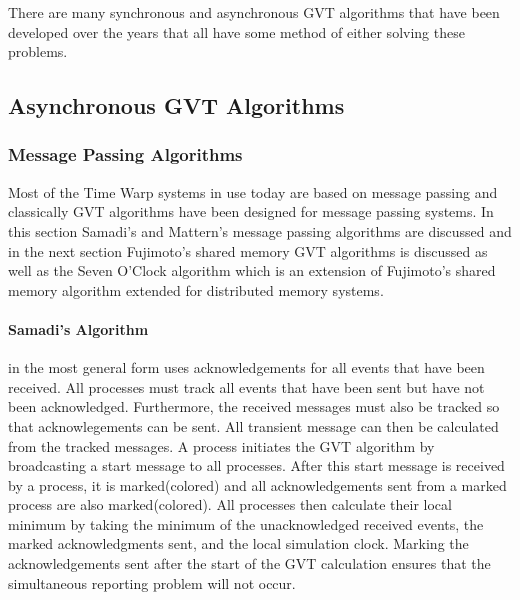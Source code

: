 \documentclass[11pt]{book}
\begin{document}
\noindent
There are many synchronous and asynchronous GVT algorithms that have been developed over the
years that all have some method of either solving these problems.

\subsection{Asynchronous GVT Algorithms}

\subsubsection{Message Passing Algorithms}

Most of the Time Warp systems in use today are based on message passing and classically
GVT algorithms have been designed for message passing systems.  In this section Samadi's and
Mattern's message passing algorithms are discussed and in the next section Fujimoto's shared
memory GVT algorithms is discussed as well as the Seven O'Clock algorithm which is an
extension of Fujimoto's shared memory algorithm extended for distributed memory systems.

\paragraph{Samadi's Algorithm}\cite{samadi-85} in the most general form uses acknowledgements
for all events that have been received.  All processes must track all events that have been
sent but have not been acknowledged.  Furthermore, the received messages must also be tracked
so that acknowlegements can be sent.  All transient message can then be calculated from the
tracked messages.  A process initiates the GVT algorithm by broadcasting a start message to
all processes.  After this start message is received by a process, it is marked(colored) and
all acknowledgements sent from a marked process are also marked(colored).  All processes then
calculate their local minimum by taking the minimum of the unacknowledged received events,
the marked acknowledgments sent, and the local simulation clock.  Marking the acknowledgements
sent after the start of the GVT calculation ensures that the simultaneous reporting problem
will not occur.
\end{document}
